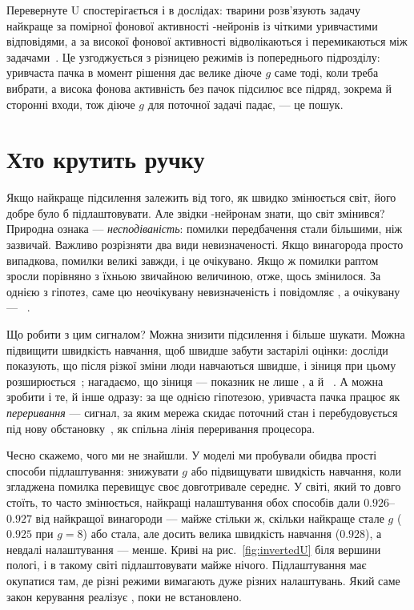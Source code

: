 Перевернуте U спостерігається і в дослідах: тварини розв'язують задачу найкраще за помірної фонової активності -нейронів із чіткими уривчастими відповідями, а за високої фонової активності відволікаються і перемикаються між задачами~\cite{AstonJones2005}. Це узгоджується з різницею режимів із попереднього підрозділу: уривчаста пачка в момент рішення дає велике діюче $g$ саме тоді, коли треба вибрати, а висока фонова активність без пачок підсилює все підряд, зокрема й сторонні входи, тож діюче $g$ для поточної задачі падає, --- це пошук.

\section{Хто крутить ручку}

Якщо найкраще підсилення залежить від того, як швидко змінюється світ, його добре було б підлаштовувати. Але звідки -нейронам знати, що світ змінився? Природна ознака --- \emph{несподіваність}: помилки передбачення стали більшими, ніж зазвичай. Важливо розрізняти два види невизначеності. Якщо винагорода просто випадкова, помилки великі завжди, і це очікувано. Якщо ж помилки раптом зросли порівняно з їхньою звичайною величиною, отже, щось змінилося. За однією з гіпотез, саме цю неочікувану невизначеність і повідомляє , а очікувану --- ~\cite{YuDayan2005}.

Що робити з цим сигналом? Можна знизити підсилення і більше шукати. Можна підвищити швидкість навчання, щоб швидше забути застарілі оцінки: досліди показують, що після різкої зміни люди навчаються швидше, і зіниця при цьому розширюється~\cite{Nassar2012}; нагадаємо, що зіниця --- показник не лише , а й ~\cite{Reimer2016}. А можна зробити і те, й інше одразу: за ще однією гіпотезою, уривчаста пачка  працює як \emph{переривання} --- сигнал, за яким мережа скидає поточний стан і перебудовується під нову обстановку~\cite{BouretSara2005}, як спільна лінія переривання процесора.

Чесно скажемо, чого ми не знайшли. У моделі ми пробували обидва прості способи підлаштування: знижувати $g$ або підвищувати швидкість навчання, коли згладжена помилка перевищує своє довготривале середнє. У світі, який то довго стоїть, то часто змінюється, найкращі налаштування обох способів дали $0.926$--$0.927$ від найкращої винагороди --- майже стільки ж, скільки найкраще стале $g$ ($0.925$ при $g=8$) або стала, але досить велика швидкість навчання ($0.928$), а невдалі налаштування --- менше. Криві на рис.~\ref{fig:invertedU} біля вершини пологі, і в такому світі підлаштовувати майже нічого. Підлаштування має окупатися там, де різні режими вимагають дуже різних налаштувань. Який саме закон керування реалізує , поки не встановлено.

